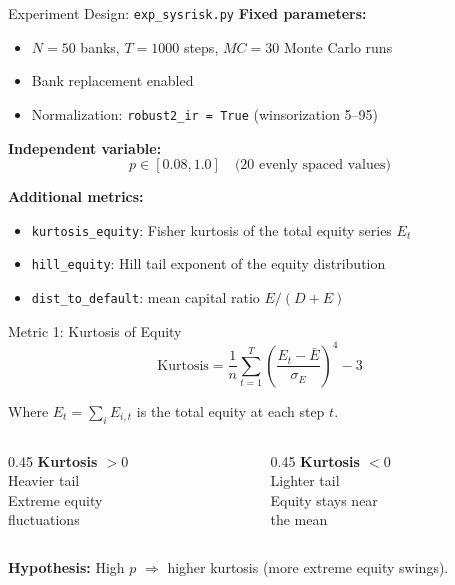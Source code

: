 \documentclass[11pt]{beamer}
\begin{document}
\begin{frame}{Experiment Design: \texttt{exp\_sysrisk.py}}
\small
\noindent\textbf{Fixed parameters:}
\begin{itemize}
    \item $N = 50$ banks, $T = 1000$ steps, $MC = 30$ Monte Carlo runs
    \item Bank replacement enabled
    \item Normalization: \texttt{robust2\_ir = True} (winsorization 5--95)
\end{itemize}

\medskip
\noindent\textbf{Independent variable:}
\[
p \in [0.08, 1.0] \quad \text{(20 evenly spaced values)}
\]

\medskip
\noindent\textbf{Additional metrics:}
\begin{itemize}
    \item \texttt{kurtosis\_equity}: Fisher kurtosis of the total equity series $E_t$
    \item \texttt{hill\_equity}: Hill tail exponent of the equity distribution
    \item \texttt{dist\_to\_default}: mean capital ratio $E/(D+E)$
\end{itemize}
\end{frame}

\begin{frame}{Metric 1: Kurtosis of Equity}
\centering
\Large
\[
\text{Kurtosis} = \frac{1}{n} \sum_{t=1}^T
\left( \frac{E_t - \bar{E}}{\sigma_E} \right)^4 - 3
\]

\vspace{0.5em}
\normalsize
\noindent
Where $E_t = \sum_i E_{i,t}$ is the total equity at each step $t$.

\vspace{1em}
\begin{columns}
\begin{column}{0.45\textwidth}
\centering
\textbf{Kurtosis $> 0$}\\
Heavier tail\\
Extreme equity\\
fluctuations
\end{column}
\begin{column}{0.45\textwidth}
\centering
\textbf{Kurtosis $< 0$}\\
Lighter tail\\
Equity stays near\\
the mean
\end{column}
\end{columns}

\vspace{0.5em}
\noindent\textbf{Hypothesis:} High $p$ $\Rightarrow$ higher kurtosis (more extreme equity swings).
\end{frame}
\end{document}
